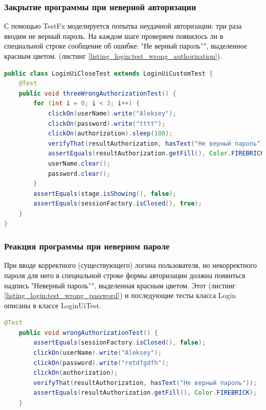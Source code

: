 \documentclass[a4paper,12pt]{article}
\begin{document}
\subsubsection{Закрытие программы при неверной авторизации}
С помощью TestFx моделируется попытка неудачной авторизации: три раза вводим не верный пароль. На каждом шаге проверяем появилось ли в специальной строке сообщение об ошибке: "Не верный пароль''", выделенное красным цветом. (листинг \ref{listing_login:test_wrong_authorization}).
\begin{lstlisting}[language=java, caption=Тестирование неверной авторизации, label=listing_login:test_wrong_authorization]
public class LoginUiCloseTest extends LoginUiCustomTest {
    @Test
    public void threeWrongAuthorizationTest() {
        for (int i = 0; i < 3; i++) {
            clickOn(userName).write("Aleksey");
            clickOn(password).write("tttt");
            clickOn(authorization).sleep(100);
            verifyThat(resultAuthorization, hasText("Не верный пароль"));
            assertEquals(resultAuthorization.getFill(), Color.FIREBRICK);
            userName.clear();
            password.clear();
        }
        assertEquals(stage.isShowing(), false);
        assertEquals(sessionFactory.isClosed(), true);
    }
}
\end{lstlisting}

\subsubsection{Реакция программы при неверном пароле}
При вводе корректного (существующего) логина пользователя, но некорректного пароля для него в специальной строке формы авторизации должна появиться надпись "Неверный пароль''", выделенная красным цветом. Этот (листинг \ref{listing_login:test_wrong_password}) и последующие тесты класса Login описаны в классе LoginUiTest.

\begin{lstlisting}[language=java, caption=Тестирование ввода неверного пароля, label=listing_login:test_wrong_password]      
    @Test
    public void wrongAuthorizationTest() {
        assertEquals(sessionFactory.isClosed(), false);
        clickOn(userName).write("Aleksey");
        clickOn(password).write("retdfgdfh");
        clickOn(authorization);
        verifyThat(resultAuthorization, hasText("Не верный пароль"));
        assertEquals(resultAuthorization.getFill(), Color.FIREBRICK);
    }
\end{lstlisting}
\end{document}
